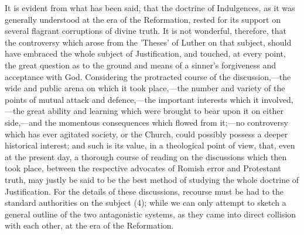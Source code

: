\documentclass[
]{book}
\begin{document}
It is evident from what has been said, that the doctrine of Indulgences, as it was generally understood at the era of the Reformation, rested for its support on several flagrant corruptions of divine truth. It is not wonderful, therefore, that the controversy which arose from the 'Theses' of Luther on that subject, should have embraced the whole subject of Justification, and touched, at every point, the great question as to the ground and means of a sinner's forgiveness and acceptance with God. Considering the protracted course of the discussion,---the wide and public arena on which it took place,---the number and variety of the points of mutual attack and defence,---the important interests which it involved,---the great ability and learning which were brought to bear upon it on either side,---and the momentous consequences which flowed from it;---no controversy which has ever agitated society, or the Church, could possibly possess a deeper historical interest; and such is its value, in a theological point of view, that, even at the present day, a thorough course of reading on the discussions which then took place, between the respective advocates of Romish error and Protestant truth, may justly be said to be the best method of studying the whole doctrine of Justification. For the details of these discussions, recourse must be had to the standard authorities on the subject (4); while we can only attempt to sketch a general outline of the two antagonistic systems, as they came into direct collision with each other, at the era of the Reformation.
\end{document}
